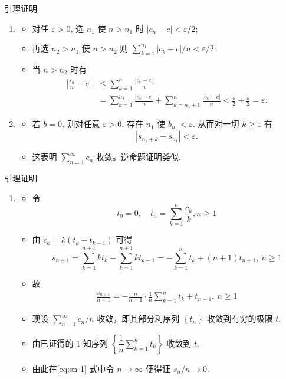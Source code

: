\documentclass[Prob-All.tex]{subfiles}
\begin{document}
\begin{frame}{引理证明}
\begin{enumerate}[1.]
  \item
  \begin{itemize}
	\item 对任 $\varepsilon>0$, 选 $n_{1}$ 使 $n>n_{1}$ 时 $\left|c_{n}-c\right|<\varepsilon / 2$;
	\item 再选 $n_{2}>n_{1}$ 使 $n>n_{2}$ 则 $\sum_{k=1}^{n_{1}}\left|c_{k}-c\right| / n<\varepsilon / 2$.
	\item 当 $n>n_{2}$ 时有
	\begin{align}
	\left|\frac{s_{n}}{n}-c\right| &\leq \sum_{k=1}^{n} \frac{\left|c_{k}-c\right|}{n} \\
	&=\sum_{k=1}^{n_{1}} \frac{\left|c_{k}-c\right|}{n}+\sum_{k=n_1+1}^{n} \frac{\left|c_{k}-c\right|}{n}<\frac{\varepsilon}{2}+\frac{\varepsilon}{2}=\varepsilon .
	\end{align}
\end{itemize}
\item \begin{itemize}
	\item 若 $b=0$, 则对任意 $\varepsilon>0$, 存在 $n_{1}$ 使 $b_{n_{1}}<\varepsilon$. 从而对一切 $k \geq 1$ 有
	\[\left|s_{n_{1}+k}-s_{n_{1}}\right|<\varepsilon.\]
	\item 这表明 $\sum_{n=1}^{\infty} c_{n}$ 收敛。逆命题证明类似.
\end{itemize}


\end{enumerate}

\end{frame}

\begin{frame}{引理证明}
\begin{enumerate}[3.]
	\item \begin{itemize}[<+-|alert@+>]
		\item 令
		\[
		t_{0}=0, \quad t_{n}=\sum_{k=1}^{n} \frac{c_{k}}{k},  n \geq 1
		\]

		\item 由 $c_{k}=k\left(t_{k}-t_{k-1}\right)$ 可得
		\[
		s_{n+1}=\sum_{k=1}^{n+1} k t_{k}-\sum_{k=1}^{n+1} k t_{k-1}=-\sum_{k=1}^{n} t_{k}+(n+1) t_{n+1},\  n \geq 1
		\]
		\item 故
		\begin{align}\label{eq:sn-1}
			\frac{s_{n+1}}{n+1}=-\frac{n}{n+1} \cdot \frac{1}{n} \sum_{k=1}^{n} t_{k}+t_{n+1},\  n \geq 1
		\end{align}

		\item 现设 $\sum_{n=1}^{\infty} c_{n} / n$ 收敛，即其部分利序列 $\left\{t_{n}\right\}$ 收敛到有穷的极限 $t$.
		\item 由已证得的 $1$ 知序列 $\left\{\dfrac{1}{n} \sum_{k=1}^{n} t_{k}\right\}$ 收敛到 $t$.
		\item 由此在\eqref{eq:sn-1} 式中令 $n \rightarrow \infty$ 便得证 $s_{n} / n \rightarrow 0$. %
	\end{itemize}
\end{enumerate}

\end{frame}
\end{document}
